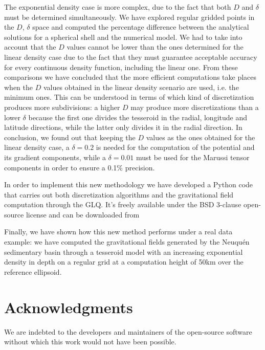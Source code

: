 \documentclass[extra]{gji}
\begin{document}
The exponential density case is more complex, due to the fact that both $D$
and $\delta$ must be determined simultaneously.
We have explored regular gridded points in the $D$, $\delta$ space and
computed the percentage difference between the analytical solutions for a
spherical shell and the numerical model.
We had to take into account that the $D$ values cannot be lower than the ones
determined for the linear density case due to the fact that they must
guarantee acceptable accuracy for every continuous density function, including
the linear one.
From these comparisons we have concluded that the more efficient computations
take places when the $D$ values obtained in the linear density scenario are
used, i.e. the minimum ones.
This can be understood in terms of which kind of discretization produces more
subdivisions: a higher $D$ may produce more discretizations than a lower
$\delta$ because the first one divides the tesseroid in the radial, longitude
and latitude directions, while the latter only divides it in the radial
direction.
In conclusion, we found out that keeping the $D$ values as the ones obtained
for the linear density case, a $\delta = 0.2$ is needed for the computation of
the potential and its gradient components, while a $\delta = 0.01$ must be
used for the Marussi tensor components in order to ensure a 0.1\% precision.

In order to implement this new methodology we have developed a Python code
that carries out both discretization algorithms and the gravitational field
computation through the GLQ. It's freely available under the BSD 3-clause
open-source license and can be downloaded from

Finally, we have shown how this new method performs under a real data example:
we have computed the gravitational fields generated by the Neuqu\'en
sedimentary basin through a tesseroid model with an increasing exponential
density in depth on a regular grid at a computation height of 50km over the
reference ellipsoid.



\section{Acknowledgments}

We are indebted to the developers and maintainers of the open-source
software without which this work would not have been possible.




\end{document}
